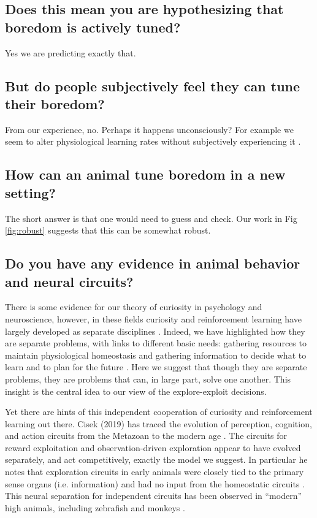 \subsection*{Does this mean you are hypothesizing that boredom is actively tuned?}
Yes we are predicting exactly that.


\subsection*{But do people subjectively feel they can tune their boredom?}
From our experience, no. Perhaps it happens unconsciously? For example we seem to alter physiological learning rates without subjectively experiencing it \citep{Behrens2007}.


\subsection*{How can an animal tune boredom in a new setting?}
The short answer is that one would need to guess and check. Our work in Fig \ref{fig:robust} suggests that this can be somewhat robust.


\subsection*{Do you have any evidence in animal behavior and neural circuits?}
There is some evidence for our theory of curiosity in psychology and neuroscience, however, in these fields curiosity and reinforcement learning have largely developed as separate disciplines \citep{Berlyne1950,Kidd2015,Sutton2018}. Indeed, we have highlighted how they are separate problems, with links to different basic needs: gathering resources to maintain physiological homeostasis \citep{Keramati2014,Juechems2019} and gathering information to decide what to learn and to plan for the future \citep{Valiant1984,Sutton2018}. Here we suggest that though they are separate problems, they are problems that can, in large part, solve one another. This insight is the central idea to our view of the explore-exploit decisions. 

Yet there are hints of this independent cooperation of curiosity and reinforcement learning out there. Cisek (2019) has traced the evolution of perception, cognition, and action circuits from the Metazoan to the modern age \citep{Cisek2019}. The circuits for reward exploitation and observation-driven exploration appear to have evolved separately, and act competitively, exactly the model we suggest. In particular he notes that exploration circuits in early animals were closely tied to the primary sense organs (i.e. information) and had no input from the homeostatic circuits \citep{Keramati2014,Cisek2019,Juechems2019}. This neural separation for independent circuits has been observed in ``modern'' high animals, including zebrafish \citep{Marques2019} and monkeys \citep{White2019,Wang2019}. 


